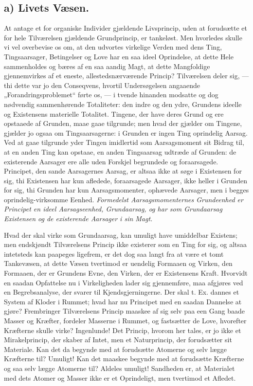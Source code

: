 \documentclass[12pt,a4paper]{book}
\begin{document}
\subsection*{a) Livets Væsen.}

At antage et for organiske Individer gjældende Livsprincip, uden at
forudsætte et for hele Tilværelsen gjældende Grundprincip, er tankeløst.
Men hvorledes skulle vi vel overbevise os om, at den udvortes virkelige
Verden med dens Ting, Tingsaarsager, Betingelser og Love har en saa ideel
Oprindelse, at dette Hele sammenholdes og bæres af en saa aandig Magt, at
dette Mangfoldige gjennemvirkes af et eneste, allestedsnærværende
Princip? Tilværelsen deler sig, — thi dette var jo den Conseqvens,
hvortil Undersøgelsen angaaende „Forandringsproblemet“ førte os, — i
tvende hinanden modsatte og dog nødvendig sammenhørende Totaliteter: den
indre og den ydre, Grundens ideelle og Existensens materielle Totalitet.
Tingene, der have deres Grund og ere opstaaede af Grunden, maae gaae
tilgrunde; men hvad der gjælder om Tingene, gjælder jo ogsaa om
Tingsaarsagerne: i Grunden er ingen Ting oprindelig Aarsag. Ved at gaae
tilgrunde yder Tingen imidlertid som Aarsagsmoment sit Bidrag til, at en
anden Ting kan opstaae, en anden Tingsaarsag udtræde af Grunden: de
existerende Aarsager ere alle uden Forskjel begrundede og foraarsagede.
Principet, den sande Aarsagernes Aarsag, er altsaa ikke at søge i
Existensen for sig, thi Existensen har kun afledede, foraarsagede
Aarsager, ikke heller i Grunden for sig, thi Grunden har kun
Aarsagsmomenter, ophævede Aarsager, men i begges oprindelig-virksomme
Eenhed. \emph{Formedelst Aarsagsmomenternes Grundeenhed er Principet en
ideel Aarsagseenhed, Grundaarsag, og har som Grundaarsag Existensen og de
existerende Aarsager i sin Magt.}

Hvad der skal virke som Grundaarsag, kan umuligt have umiddelbar
Existens; men endskjøndt Tilværelsens Princip ikke existerer som en Ting
for sig, og altsaa intetsteds kan paapeges ligefrem, er det dog saa
langt fra at være et tomt Tankevæsen, at dette Væsen tvertimod er
uendelig Formaaen og Virken, den Formaaen, der er Grundens Evne, den
Virken, der er Existensens Kraft. Hvorvidt en saadan Opfattelse nu i
Virkeligheden lader sig gjennemføre, maa afgjøres ved en
Begrebsanalyse, der svarer til Kjendsgjerningerne. Der skal t. Ex.
dannes et System af Kloder i Rummet; hvad har nu Principet med en
saadan Dannelse at gjøre? Frembringer Tilværelsens Princip maaskee af
sig selv paa een Gang baade Masser og Kræfter, fordeler Masserne i
Rummet, og fastsætter de Love, hvorefter Kræfterne skulle virke?
Ingenlunde! Det Princip, hvorom her tales, er jo ikke et
Mirakelprincip, der skaber af Intet, men et Naturprincip, der
forudsætter sit Materiale. Kan det da begynde med at forudsætte
Atomerne og selv lægge Kræfterne til? Umuligt! Kan det maaskee begynde
med at forudsætte Kræfterne og saa selv lægge Atomerne til? Aldeles
umuligt! Sandheden er, at Materialet med dets Atomer og Masser ikke er
et Oprindeligt, men tvertimod et Afledet.
\end{document}
